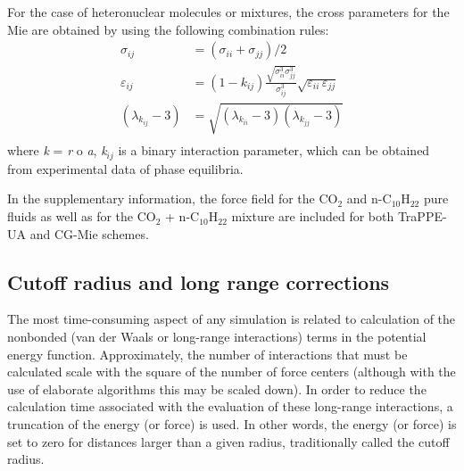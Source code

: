 \documentclass[9pt,bestpractices]{livecoms}
\begin{document}
\begin{mdframed}[linewidth=0pt,backgroundcolor=LiveCoMSLightBlue!8,fontcolor=LiveCoMSDarkBlue!80!black]
For the case of heteronuclear molecules or mixtures, the cross parameters for the Mie are obtained by using the following combination rules:
\begin{align}
  \sigma_{ij} &= \left(\sigma_{ii}+\sigma_{jj}\right)/2 \\
  \varepsilon_{ij} &= \left(1-k_{ij}\right)\frac{\sqrt{\sigma_{ii}^{3}\sigma_{jj}^{3}}}{\sigma_{ij}^{3}}\sqrt{\varepsilon_{ii}\,\varepsilon_{jj}} \\
  \left(\lambda_{k_{ij}}-3\right) &= \sqrt{\left(\lambda_{k_{ii}}-3\right)\left(\lambda_{k_{jj}}-3\right)} \\
\end{align}
where \textit{k} = \textit{r} o \textit{a}, \textit{k}$_{ij}$ is a binary
interaction parameter, which can be obtained from experimental data of phase
equilibria.

In the supplementary information, the force field for the CO$_{2}$ and
n-C$_{10}$H$_{22}$ pure fluids as well as for the CO$_{2}$ + n-C$_{10}$H$_{22}$
mixture are included for both TraPPE-UA and CG-Mie schemes.
\end{mdframed}

\subsection{Cutoff radius and long range corrections} 
The most time-consuming aspect of any simulation is related to calculation of the nonbonded (van
der Waals or long-range interactions) terms in the potential energy function.
Approximately, the number of interactions that must be calculated scale with
the square of the number of force centers (although with the use of elaborate
algorithms this may be scaled down). In order to reduce the calculation time
associated with the evaluation of these long-range interactions, a truncation
of the energy (or force) is used. In other words, the energy (or force) is set
to zero for distances larger than a given radius, traditionally called the
cutoff radius. 
\end{document}
